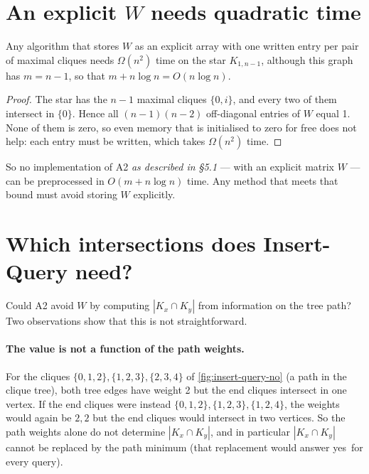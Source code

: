 \documentclass[11pt,a4paper,oneside]{report}
\theoremstyle{plain}
\theoremstyle{definition}
\theoremstyle{remark}
\newcommand{\yes}{\textsf{yes}}
\newcommand{\op}[1]{\textsf{#1}}
\begin{document}
\section{An explicit \texorpdfstring{\(W\)}{W} needs quadratic time}\label{sec:preproc-explicit}
\begin{proposition}\label{prop:w-lower}
Any algorithm that stores \(W\) as an explicit array with one written entry per pair of maximal
cliques needs \(\Omega(n^2)\) time on the star \(K_{1,n-1}\), although this graph has
\(m=n-1\), so that \(m+n\log n=O(n\log n)\).
\end{proposition}
\begin{proof}
The star has the \(n-1\) maximal cliques \(\{0,i\}\), and every two of them intersect in
\(\{0\}\). Hence all \((n-1)(n-2)\) off-diagonal entries of \(W\) equal 1. None of them is zero,
so even memory that is initialised to zero for free does not help: each entry must be written,
which takes \(\Omega(n^2)\) time.
\end{proof}

So no implementation of A2 \emph{as described in \S5.1} --- with an explicit matrix \(W\) ---
can be preprocessed in \(O(m+n\log n)\) time. Any method that meets that bound must avoid
storing \(W\) explicitly.

\section{Which intersections does \op{Insert-Query} need?}\label{sec:preproc-needed}
Could A2 avoid \(W\) by computing \(|K_x\cap K_y|\) from information on the tree path? Two
observations show that this is not straightforward.

\paragraph{The value is not a function of the path weights.}\label{sec:path-min-counterexample}
For the cliques \(\{0,1,2\},\{1,2,3\},\{2,3,4\}\) of \cref{fig:insert-query-no} (a path in the
clique tree), both tree edges have weight 2 but the end cliques intersect in one vertex. If the
end cliques were instead \(\{0,1,2\},\{1,2,3\},\{1,2,4\}\), the weights would again be \(2,2\) but
the end cliques would intersect in two vertices. So the path weights alone do not determine
\(|K_x\cap K_y|\), and in particular \(|K_x\cap K_y|\) cannot be replaced by the path minimum
(that replacement would answer \yes\ for every query).
\end{document}
